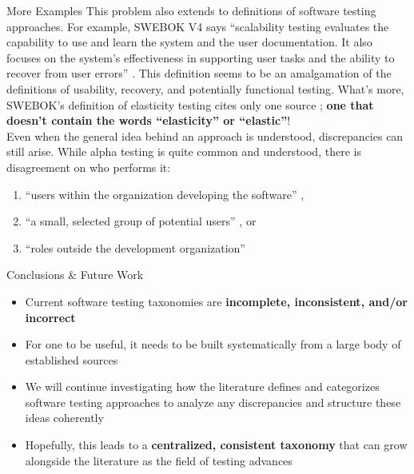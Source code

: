 \documentclass[22pt]{beamer}
\begin{document}
\begin{frame}[fragile]
\begin{textblock}{7.25}
\begin{block}{\fontsize{37}{20}\selectfont More Examples}
            This problem also extends to definitions of software testing
            approaches. For example, SWEBOK V4 says ``scalability testing
            evaluates the capability to use and learn the system and the user
            documentation. It also focuses on the system's effectiveness in
            supporting user tasks and the ability to recover from user errors''
            \cite[p.~5-9]{SWEBOK2024}. This definition seems to be an
            amalgamation of the definitions of usability, recovery, and
            potentially functional testing. What's more, SWEBOK's definition
            of elasticity testing cites only one source \cite[p.~5-9]{SWEBOK2024};
            \textbf{one that doesn't contain the words ``elasticity'' or ``elastic''}!
            \vspace{5mm}\\
            Even when the general idea behind an approach is understood,
            discrepancies can still arise. While alpha testing is quite common
            and understood, there is disagreement on who performs it:
            \begin{enumerate}
                \item ``users within the organization developing the software''
                      \cite[p.~17]{IEEE2017},
                \item ``a small, selected group of potential users''
                      \cite[p.~5-8]{SWEBOK2024}, or
                \item ``roles outside the development organization''
                      \cite{ISTQB}
            \end{enumerate}
            \vspace{5mm}
        \end{block}

        \begin{block}{\fontsize{37}{20}\selectfont Conclusions \& Future Work}
            \begin{itemize}
                \item Current software testing taxonomies are \textbf{incomplete,
                          inconsistent, and/or incorrect}
                \item For one to be useful, it needs to be built systematically
                      from a large body of established sources
                \item We will continue investigating how the literature defines
                      and categorizes software testing approaches to analyze any
                      discrepancies and structure these ideas coherently
                \item Hopefully, this leads to a \textbf{centralized, consistent
                          taxonomy} that can grow alongside the literature as the
                      field of testing advances
            \end{itemize}
            \vspace{5mm}
        \end{block}


\end{textblock}
\end{frame}
\end{document}
